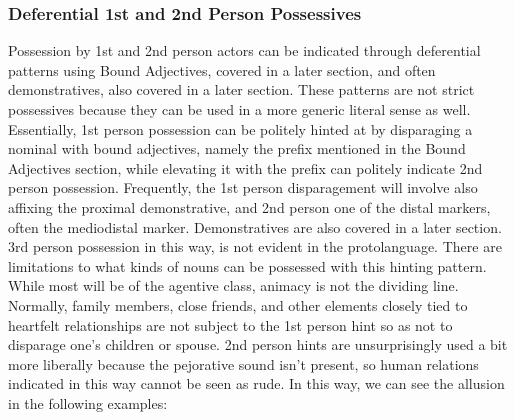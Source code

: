     \subsubsection{Deferential 1st and 2nd Person Possessives}
    Possession by 1st and 2nd person actors can be indicated through deferential patterns using Bound Adjectives, covered in a later section, and often demonstratives, also covered in a later section. These patterns are not strict possessives because they can be used in a more generic literal sense as well. Essentially, 1st person possession can be politely hinted at by disparaging a nominal with bound adjectives, namely the \prefixtext{\boundbad} prefix mentioned in the Bound Adjectives section, while elevating it with the \prefixtext{\boundtrue} prefix can politely indicate 2nd person possession. Frequently, the 1st person disparagement will involve also affixing the proximal demonstrative, and 2nd person one of the distal markers, often the mediodistal marker. Demonstratives are also covered in a later section. 3rd person possession in this way, is not evident in the protolanguage.
    There are limitations to what kinds of nouns can be possessed with this hinting pattern. While most will be of the agentive class, animacy is not the dividing line. Normally, family members, close friends, and other elements closely tied to heartfelt relationships are not subject to the 1st person hint so as not to disparage one's children or spouse. 2nd person hints are unsurprisingly used a bit more liberally because the pejorative sound isn't present, so human relations indicated in this way cannot be seen as rude. In this way, we can see the allusion in the following examples:
    \vertspace

